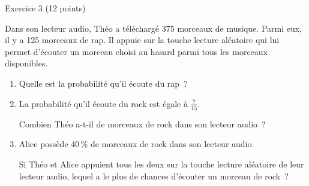 
%
\begin{h2}Exercice 3 (12 points)\end{h2}
\medbreak
Dans son lecteur audio, Théo a téléchargé 375 morceaux de musique. Parmi eux, il y a 125 morceaux de rap. Il appuie sur la touche \og lecture aléatoire\fg{} qui lui permet d'écouter un morceau choisi au hasard parmi tous les morceaux disponibles.
\medbreak
\begin{enumerate}
     \item Quelle est la probabilité qu'il écoute du rap~?
     \item La probabilité qu'il écoute du rock est égale à $\frac{7}{15}$.
     \par
     Combien Théo a-t-il de morceaux de rock dans son lecteur audio~?
     \item  Alice possède 40\,\% de morceaux de rock dans son lecteur audio.
     \par
     Si Théo et Alice appuient tous les deux sur la touche \og lecture aléatoire\fg{} de leur lecteur audio, lequel a le plus de chances d'écouter un morceau de rock~?
\end{enumerate}
